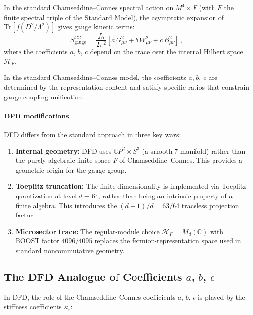 \documentclass[12pt,a4paper]{article}
\begin{document}
In the standard Chamseddine--Connes spectral action on $M^4 \times F$
(with $F$ the finite spectral triple of the Standard Model), the
asymptotic expansion of $\mathrm{Tr}[f(D^2/\Lambda^2)]$ gives gauge
kinetic terms:
\begin{equation}
S_{\mathrm{gauge}}^{\mathrm{CC}} = \frac{f_0}{2\pi^2}
\left[a\,G_{\mu\nu}^2 + b\,W_{\mu\nu}^2 + c\,B_{\mu\nu}^2\right]\,,
\end{equation}
where the coefficients $a$, $b$, $c$ depend on the trace over the
internal Hilbert space $\mathcal{H}_F$.

In the standard Chamseddine--Connes model, the coefficients $a$, $b$, $c$
are determined by the representation content and satisfy specific ratios
that constrain gauge coupling unification.

\paragraph{DFD modifications.}
DFD differs from the standard approach in three key ways:

\begin{enumerate}
\item \textbf{Internal geometry:} DFD uses $\mathbb{C}P^2 \times S^3$
  (a smooth 7-manifold) rather than the purely algebraic finite space $F$
  of Chamseddine--Connes. This provides a geometric origin for the
  gauge group.

\item \textbf{Toeplitz truncation:} The finite-dimensionality is
  implemented via Toeplitz quantization at level $d = 64$, rather than
  being an intrinsic property of a finite algebra. This introduces the
  $(d-1)/d = 63/64$ traceless projection factor.

\item \textbf{Microsector trace:} The regular-module choice
  $\mathcal{H}_F = M_d(\mathbb{C})$ with BOOST factor $4096/4095$
  replaces the fermion-representation space used in standard
  noncommutative geometry.
\end{enumerate}

\subsection{The DFD Analogue of Coefficients $a$, $b$, $c$}

In DFD, the role of the Chamseddine--Connes coefficients $a$, $b$, $c$
is played by the stiffness coefficients $\kappa_r$:
\end{document}
